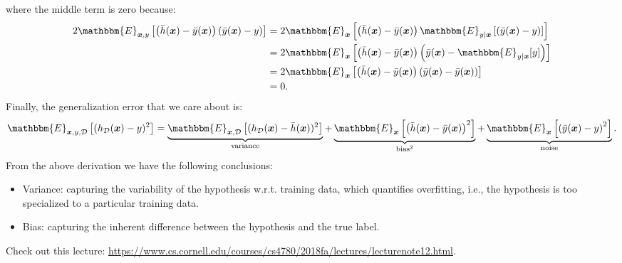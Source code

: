         where the middle term is zero because:
            \begin{equation}
                \begin{aligned}
                        2\mathbbm{E}_{\bm{x}, y }\left[ \left( \bar{h}(\bm{x}) - \bar{y}(\bm{x}) \right)\left( \bar{y}(\bm{x}) - y \right) \right]    & = 2\mathbbm{E}_{\bm{x}}\left[ \left( \bar{h}(\bm{x}) - \bar{y}(\bm{x}) \right)    \mathbbm{E}_{y|\bm{x}}\left[\left( \bar{y}(\bm{x}) - y \right) \right] \right] \\
                        & = 2\mathbbm{E}_{\bm{x}}\left[ \left( \bar{h}(\bm{x}) - \bar{y}(\bm{x}) \right) \left( \bar{y}(\bm{x}) - \mathbbm{E}_{y|\bm{x}}[y] \right) \right] \\
                        & = 2\mathbbm{E}_{\bm{x}}\left[ \left( \bar{h}(\bm{x}) - \bar{y}(\bm{x}) \right) \left( \bar{y}(\bm{x}) - \bar{y}(\bm{x}) \right) \right] \\
                        & = 0.
                \end{aligned}
            \end{equation}
        Finally, the generalization error that we care about is:
            \begin{equation}
                \mathbbm{E}_{\bm{x}, y, \mathcal{D}}\left[ (h_{\mathcal{D}}(\bm{x}) - y )^2 \right] = \underbrace{\mathbbm{E}_{\bm{x}, \mathcal{D}}\left[ (h_{\mathcal{D}}(\bm{x}) - \bar{h}(\bm{x}))^2 \right]}_{\text{variance}} + \underbrace{\mathbbm{E}_{\bm{x} }\left[ \left( \bar{h}(\bm{x}) - \bar{y}(\bm{x}) \right)^2 \right]}_{\text{bias}^2} + \underbrace{\mathbbm{E}_{\bm{x}}\left[ \left( \bar{y}(\bm{x}) - y \right)^2 \right]}_{\text{noise}}.
            \end{equation}
        From the above derivation we have the following conclusions:
            \begin{itemize}
                \item Variance: capturing the variability of the hypothesis w.r.t. training data, which quantifies overfitting, i.e., the hypothesis is too specialized to a particular training data.
                \item Bias: capturing the inherent difference between the hypothesis and the true label.
            \end{itemize}
        Check out this lecture: \url{https://www.cs.cornell.edu/courses/cs4780/2018fa/lectures/lecturenote12.html}.
        
